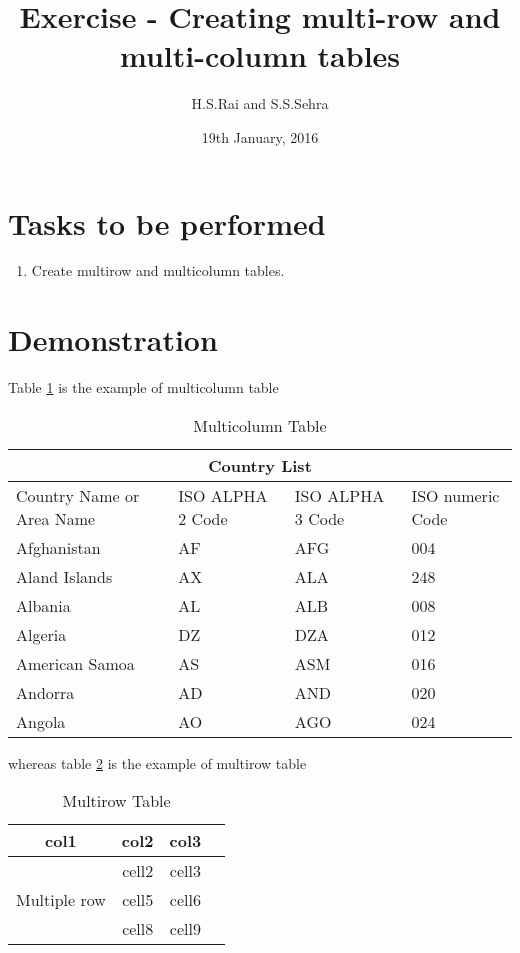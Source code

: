 \documentclass{article}
\title{Exercise  - Creating multi-row and multi-column tables}
\author{H.S.Rai and S.S.Sehra}
\date{19th January, 2016}
\begin{document}
	\maketitle	
	\section*{Tasks to be performed}
	\begin{enumerate}	
		\item Create multirow and multicolumn tables.
	\end{enumerate}
	\section*{Demonstration}
	Table \ref{table:2} is the example of multicolumn table
	\begin{table}[h]
		\centering

	\begin{tabular}{ |p{3cm}||p{3cm}|p{3cm}|p{3cm}|  }
		\hline
		\multicolumn{4}{|c|}{Country List} \\
		\hline
		Country Name     or Area Name& ISO ALPHA 2 Code &ISO ALPHA 3 Code&ISO numeric Code\\
		\hline
		Afghanistan   & AF    &AFG&   004\\
		Aland Islands&   AX  & ALA   &248\\
		Albania &AL & ALB&  008\\
		Algeria    &DZ & DZA&  012\\
		American Samoa&   AS  & ASM&016\\
		Andorra& AD  & AND   &020\\
		Angola& AO  & AGO&024\\
		\hline
		\end{tabular}
		\caption{Multicolumn Table}
		\label{table:2}
			\end{table}
			
	whereas	table \ref{table:3} is the example of multirow table
			\begin{table}[h]
				\centering
			\begin{tabular}{ |c|c|c|c| } 
		\hline
		col1 & col2 & col3 \\
		\hline
		\multirow{3}{4em}{Multiple row} & cell2 & cell3 \\ 
		& cell5 & cell6 \\ 
		& cell8 & cell9 \\ 
		\hline
	\end{tabular}
\caption{Multirow Table}
\label{table:3}
\end{table}
\end{document}
